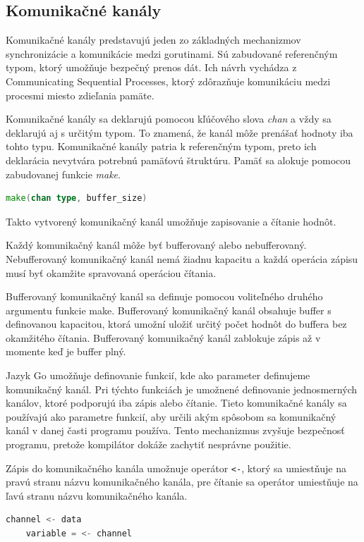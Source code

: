 \documentclass[
  biblatex,
  seconds=true,
  language=slovak,
  figures=false,
  urldate=iso,
  glossaries,
  index
]{kidiplom}
\begin{document}
\subsection{Komunikačné kanály}
Komunikačné kanály predstavujú jeden zo základných mechanizmov synchronizácie a komunikácie medzi gorutinami. Sú zabudované referenčným typom,
ktorý umožňuje bezpečný prenos dát. Ich návrh vychádza z Communicating Sequential Processes,
ktorý zdôrazňuje komunikáciu medzi procesmi miesto zdieľania pamäte.\cite{cox2017}

Komunikačné kanály sa deklarujú pomocou kľúčového slova \emph{chan}
a vždy sa deklarujú aj s určitým typom. To znamená, že kanál môže prenášať hodnoty
iba tohto typu.
Komunikačné kanály patria k referenčným typom, preto ich deklarácia nevytvára potrebnú pamäťovú štruktúru.
Pamäť sa alokuje pomocou zabudovanej funkcie \emph{make}.
\begin{lstlisting}[language=Go]
    make(chan type, buffer_size)
\end{lstlisting}
Takto vytvorený komunikačný kanál umožňuje zapisovanie a čítanie hodnôt.

Každý komunikačný kanál môže byť bufferovaný alebo nebufferovaný. Nebufferovaný komunikačný kanál nemá žiadnu kapacitu a každá operácia zápisu musí
byť okamžite spravovaná operáciou čítania. \cite{goChan}

Bufferovaný komunikačný kanál sa definuje pomocou voliteľného druhého argumentu funkcie make.
Bufferovaný komunikačný kanál obsahuje buffer s definovanou kapacitou, ktorá umožní uložiť určitý počet hodnôt do buffera bez okamžitého čítania.
Bufferovaný komunikačný kanál zablokuje zápis až v momente keď je buffer plný.

Jazyk Go umožňuje definovanie funkcií, kde ako parameter definujeme komunikačný kanál. Pri týchto funkciách je umožnené
definovanie jednosmerných kanálov, ktoré podporujú iba zápis alebo čítanie. Tieto komunikačné kanály sa používajú ako parametre
funkcií, aby určili akým spôsobom sa komunikačný kanál v danej časti programu používa. Tento mechanizmus zvyšuje bezpečnosť programu, pretože
kompilátor dokáže zachytiť nesprávne použitie.

Zápis do komunikačného kanála umožnuje operátor \texttt{<-}, ktorý sa umiestňuje na pravú stranu názvu komunikačného kanála,
pre čítanie sa operátor umiestňuje na ľavú stranu názvu komunikačného kanála.
\begin{lstlisting}[language=Go]
    channel <- data
    variable = <- channel
\end{lstlisting}
\end{document}
